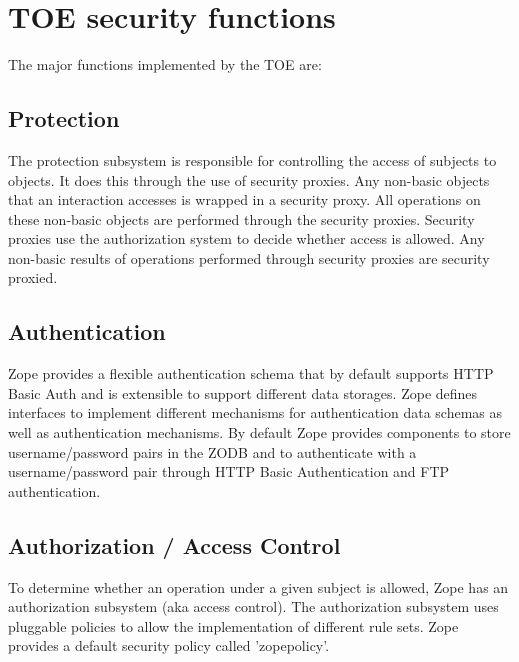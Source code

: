 \documentclass[12pt,english]{scrbook}
\begin{document}
\section{TOE security functions}  \label{toe-sec-funcs}


The major functions implemented by the TOE are:




\subsection{Protection}

The protection subsystem is responsible for controlling the access of subjects
to objects.  It does this through the use of security proxies.  Any non-basic
objects that an interaction accesses is wrapped in a security proxy.  All
operations on these non-basic objects are performed through the security
proxies. Security proxies use the authorization system to decide whether access
is allowed.  Any non-basic results of operations performed through security
proxies are security proxied.




\subsection{Authentication}

Zope provides a flexible authentication schema that by default supports HTTP
Basic Auth and is extensible to support different data
storages. Zope defines interfaces to implement different mechanisms for
authentication data schemas as well as authentication mechanisms. By default
Zope provides components to store username/password pairs in the ZODB and to
authenticate with a username/password pair through HTTP Basic Authentication
and FTP authentication.





\subsection{Authorization / Access Control}

To determine whether an operation under a given subject is allowed, Zope has an
authorization subsystem (aka access control). The authorization subsystem uses
pluggable policies to allow the implementation of different rule sets. Zope
provides a default security policy called 'zopepolicy'.
\end{document}
